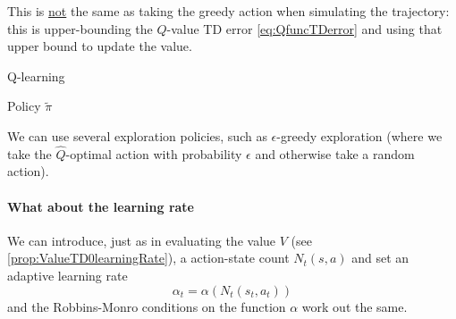 \documentclass[../course-notes.tex]{subfiles}
\begin{document}
\begin{remark}
	This is \underline{not} the same as taking the greedy action when simulating the trajectory: this is upper-bounding the $Q$-value TD error \eqref{eq:QfuncTDerror} and using that upper bound to update the value.
\end{remark}


\begin{algorithm}
	\caption{Q-learning}
	\Return Policy $\tilde{\pi}$\;
\end{algorithm}

We can use several exploration policies, such as $\epsilon$-greedy exploration (where we take the $\widehat{Q}$-optimal action with probability $\epsilon$ and otherwise take a random action).


\paragraph{What about the learning rate} We can introduce, just as in evaluating the value $V$ (see \cref{prop:ValueTD0learningRate}), a action-state count $N_t(s,a)$ and set an adaptive learning rate
\[
	\alpha_t = \alpha(N_t(s_t, a_t))
\]
and the Robbins-Monro conditions on the function $\alpha$ work out the same.
\end{document}
